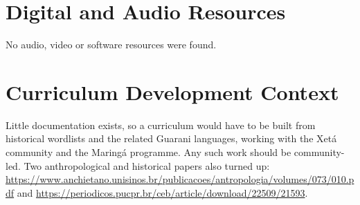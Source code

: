 \documentclass[12pt]{article}
\begin{document}
\section{Digital and Audio Resources}
No audio, video or software resources were found.

\section{Curriculum Development Context}
Little documentation exists, so a curriculum would have to be built from historical wordlists and the related Guarani languages, working with the Xet\'a community and the Maring\'a programme. Any such work should be community-led. Two anthropological and historical papers also turned up: \url{https://www.anchietano.unisinos.br/publicacoes/antropologia/volumes/073/010.pdf} and \url{https://periodicos.pucpr.br/ceb/article/download/22509/21593}.
\end{document}
